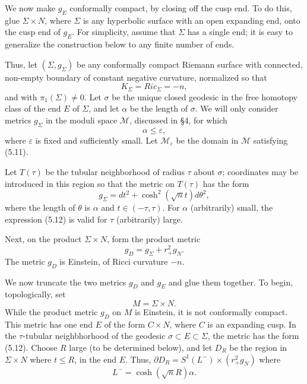 \documentclass[11pt,amsfonts]{amsart}
\begin{document}
\medskip

 We now  make $g_{E}$ conformally compact, by closing off the 
cusp end. To do this, glue $\Sigma\times N$, where $\Sigma$ is any 
hyperbolic surface with an open expanding end, onto the cusp end of 
$g_{E}$. For simplicity, assume that $\Sigma$ has a single end; it is 
easy to generalize the construction below to any finite number of ends. 

 Thus, let $(\Sigma, g_{\Sigma})$ be any conformally compact Riemann 
surface with connected, non-empty boundary of constant negative 
curvature, normalized so that 
\begin{equation} \label{e5.10}
K_{\Sigma} = Ric_{\Sigma} = -n, 
\end{equation}
and with $\pi_{1}(\Sigma) \neq 0$. Let $\sigma$ be the unique closed 
geodesic in the free homotopy class of the end $E$ of $\Sigma$, and 
let $\alpha$ be the length of $\sigma$. We will only consider metrics 
$g_{\Sigma}$ in the moduli space ${\mathcal M}$, discussed in \S 4, for 
which
\begin{equation} \label{e5.11}
\alpha  \leq  \varepsilon , 
\end{equation}
where $\varepsilon$ is fixed and sufficiently small. Let ${\mathcal 
M}_{\varepsilon}$ be the domain in ${\mathcal M}$ satisfying (5.11). 

 Let $T(\tau)$ be the tubular neighborhood of radius $\tau$ about 
$\sigma$; coordinates may be introduced in this region so that the 
metric on $T(\tau)$ has the form
\begin{equation} \label{e5.12}
g_{\Sigma} = dt^{2} + \cosh^{2}(\sqrt{n}t)d\theta^{2}, 
\end{equation}
where the length of $\theta$ is $\alpha$ and $t \in  (-\tau , \tau)$. 
For $\alpha$ (arbitrarily) small, the expression (5.12) is valid 
for $\tau$ (arbitrarily) large.

 Next, on the product $\Sigma\times N$, form the product metric 
\begin{equation} \label{e5.13}
g_{D} = g_{\Sigma} + r_{+}^{2}g_{N}. 
\end{equation}
The metric $g_{D}$ is Einstein, of Ricci curvature $-n$.

 We now truncate the two metrics $g_{D}$ and $g_{E}$ and glue them 
together. To begin, topologically, set 
$$M = \Sigma\times N. $$
While the product metric $g_{D}$ on $M$ is Einstein, it is not 
conformally compact. This metric has one end $E$ of the form $C\times N$, 
where $C$ is an expanding cusp. In the $\tau$-tubular neighbhorhood of the 
geodesic $\sigma \subset E \subset \Sigma$, the metric has the form (5.12). 
Choose $R$ large (to be determined below), and let $D_{R}$ be the region in 
$\Sigma\times N$ where $t \leq R$, in the end $E$. Thus, $\partial D_{R} = 
S^{1}(L^{-})\times (r_{+}^{2}g_{N})$ where 
\begin{equation} \label{e5.14}
L^{-} = \cosh(\sqrt{n}R)\alpha . 
\end{equation}
\end{document}
